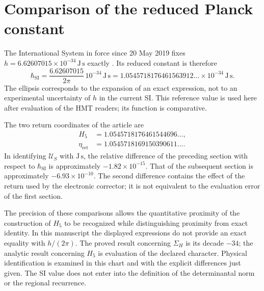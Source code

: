 \section{Comparison of the reduced Planck constant}
\label{x_reciprocidad:sec:revision-planck-contraste}

The International System in force since 20 May 2019 fixes
\(h=6.62607015\times10^{-34}\,\mathrm{J\,s}\) exactly
\cite{x_reciprocidad:bipm2018}. Its reduced constant is therefore
\[
 \hbar_{\mathrm{SI}}=\frac{6.62607015}{2\pi}\,10^{-34}\,
 \mathrm{J\,s}
 =1.0545718176461563912\ldots\times10^{-34}\,\mathrm{J\,s}.
\]
The ellipsis corresponds to the expansion of an exact
expression, not to an experimental uncertainty of \(h\) in the current SI.
This reference value is used here after evaluation of
the HMT readers; its function is comparative.

The two return coordinates of the article are
\begin{align*}
 H_5&=1.0545718176461544696\ldots,\\
 \eta_{\mathrm{ret}}&=1.0545718169150390611\ldots.
\end{align*}
In identifying \(\mathcal U_S\) with \(\mathrm{J\,s}\), the
relative difference of the preceding section with respect to
\(\hbar_{\mathrm{SI}}\) is approximately \(-1.82\times10^{-15}\).
That of the subsequent section is approximately \(-6.93\times10^{-10}\).
The second difference contains the effect of the return used by the
electronic corrector; it is not equivalent to the evaluation error of the
first section.

The precision of these comparisons allows the quantitative proximity
of the construction of \(H_5\) to be recognized while distinguishing
proximity from exact identity. In this manuscript the displayed expressions
do not provide an exact equality with \(h/(2\pi)\).
The proved result concerning \(\Sigma_H\) is its decade \(-34\);
the analytic result concerning \(H_5\) is evaluation of the declared
character. Physical identification is examined in this chart and with the
explicit differences just given. The SI value does not enter
into the definition of the determinantal norm or the regional recurrence.


